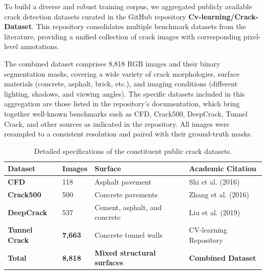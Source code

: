 \hs To build a diverse and robust training corpus, we aggregated publicly available crack detection datasets curated in the GitHub repository \textbf{Cv-learning/Crack-Dataset}. This repository consolidates multiple benchmark datasets from the literature, providing a unified collection of crack images with corresponding pixel-level annotations.

\hs The combined dataset comprises 8,818 RGB images and their binary segmentation masks, covering a wide variety of crack morphologies, surface materials (concrete, asphalt, brick, etc.), and imaging conditions (different lighting, shadows, and viewing angles). The specific datasets included in this aggregation are those listed in the repository’s documentation, which bring together well-known benchmarks such as CFD, Crack500, DeepCrack, Tunnel Crack, and other sources as indicated in the repository. All images were resampled to a consistent resolution and paired with their ground-truth masks.

\begin{table}[htbp]
    \centering
    \setlength{\tabcolsep}{5pt}
    \caption{Detailed specifications of the constituent public crack datasets.}
    \label{tab:constituent_datasets}
    \begin{tabularx}{\textwidth}{l l X X}
        \toprule
        \textbf{Dataset}      & \textbf{Images} & \textbf{Surface}                   & \textbf{Academic Citation}             \\
        \midrule
        \textbf{CFD}          & 118             & Asphalt pavement                   & Shi et al. (2016) \cite{shi-2016}      \\
        \addlinespace
        \textbf{Crack500}     & 500             & Concrete pavements                 & Zhang et al. (2016) \cite{zhang-2016}  \\
        \addlinespace
        \textbf{DeepCrack}    & 537             & Cement, asphalt, and concrete      & Liu et al. (2019) \cite{liu-2019}      \\
        \addlinespace
        \textbf{Tunnel Crack} & \textbf{7,663}  & Concrete tunnel walls              & CV-learning Repository\footnotemark[1] \\
        \midrule
        \textbf{Total}        & \textbf{8,818}  & \textbf{Mixed structural surfaces} & \textbf{Combined Dataset}              \\
        \bottomrule
    \end{tabularx}
\end{table}

